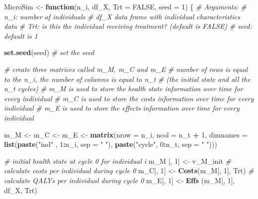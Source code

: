 \documentclass[
]{article}
\newenvironment{Shaded}{\begin{snugshade}}{\end{snugshade}}
\newcommand{\CommentTok}[1]{\textcolor[rgb]{0.56,0.35,0.01}{\textit{#1}}}
\newcommand{\ControlFlowTok}[1]{\textcolor[rgb]{0.13,0.29,0.53}{\textbf{#1}}}
\newcommand{\DataTypeTok}[1]{\textcolor[rgb]{0.13,0.29,0.53}{#1}}
\newcommand{\DecValTok}[1]{\textcolor[rgb]{0.00,0.00,0.81}{#1}}
\newcommand{\KeywordTok}[1]{\textcolor[rgb]{0.13,0.29,0.53}{\textbf{#1}}}
\newcommand{\NormalTok}[1]{#1}
\newcommand{\OperatorTok}[1]{\textcolor[rgb]{0.81,0.36,0.00}{\textbf{#1}}}
\newcommand{\OtherTok}[1]{\textcolor[rgb]{0.56,0.35,0.01}{#1}}
\newcommand{\StringTok}[1]{\textcolor[rgb]{0.31,0.60,0.02}{#1}}
\begin{document}
\begin{Shaded}
\begin{Highlighting}[]
\NormalTok{MicroSim <-}\StringTok{ }\ControlFlowTok{function}\NormalTok{(n_i, df_X, }\DataTypeTok{Trt =} \OtherTok{FALSE}\NormalTok{, }\DataTypeTok{seed =} \DecValTok{1}\NormalTok{) \{}
\CommentTok{# Arguments:  }
  \CommentTok{# n_i:     number of individuals}
    \CommentTok{# df_X     data frame with individual characteristics data }
    \CommentTok{# Trt:     is this the individual receiving treatment? (default is FALSE)}
  \CommentTok{# seed:    default is 1}
  
  \KeywordTok{set.seed}\NormalTok{(seed) }\CommentTok{# set the seed}

  \CommentTok{# create three matrices called m_M, m_C and m_E}
  \CommentTok{# number of rows is equal to the n_i, the number of columns is equal to n_t  }
  \CommentTok{# (the initial state and all the n_t cycles)}
  \CommentTok{# m_M is used to store the health state information over time for every individual}
  \CommentTok{# m_C is used to store the costs information over time for every individual}
  \CommentTok{# m_E is used to store the effects information over time for every individual}
  
\NormalTok{  m_M <-}\StringTok{ }\NormalTok{m_C <-}\StringTok{ }\NormalTok{m_E <-}\StringTok{  }\KeywordTok{matrix}\NormalTok{(}\DataTypeTok{nrow =}\NormalTok{ n_i, }\DataTypeTok{ncol =}\NormalTok{ n_t }\OperatorTok{+}\StringTok{ }\DecValTok{1}\NormalTok{, }
                                     \DataTypeTok{dimnames =} \KeywordTok{list}\NormalTok{(}\KeywordTok{paste}\NormalTok{(}\StringTok{"ind"}\NormalTok{  , }\DecValTok{1}\OperatorTok{:}\NormalTok{n_i, }\DataTypeTok{sep =} \StringTok{" "}\NormalTok{), }
                                                     \KeywordTok{paste}\NormalTok{(}\StringTok{"cycle"}\NormalTok{, }\DecValTok{0}\OperatorTok{:}\NormalTok{n_t, }\DataTypeTok{sep =} \StringTok{" "}\NormalTok{)))  }

    \CommentTok{# initial health state at cycle 0 for individual i}
\NormalTok{    m_M [, }\DecValTok{1}\NormalTok{] <-}\StringTok{ }\NormalTok{v_M_init    }
    \CommentTok{# calculate costs per individual during cycle 0}
\NormalTok{    m_C[, }\DecValTok{1}\NormalTok{]  <-}\StringTok{ }\KeywordTok{Costs}\NormalTok{(m_M[, }\DecValTok{1}\NormalTok{], Trt)     }
    \CommentTok{# calculate QALYs per individual during cycle 0}
\NormalTok{    m_E[, }\DecValTok{1}\NormalTok{]  <-}\StringTok{ }\KeywordTok{Effs}\NormalTok{ (m_M[, }\DecValTok{1}\NormalTok{], df_X, Trt)   }
    

\end{Highlighting}
\end{Shaded}
\end{document}
